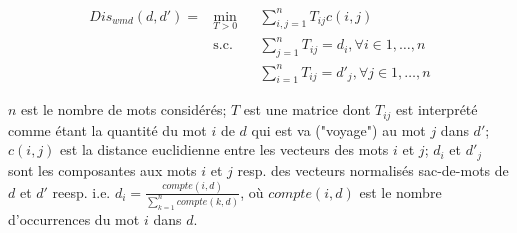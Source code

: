 \begin{itemize}
	\begin{equation*}
	\begin{aligned}
Dis_{wmd}(d, d') = 	& \min\limits_{T>0}
	& & \sum\limits_{i,j=1}^n T_{ij} c(i,j) \\
	& \text{s.c.}
	& & \sum\limits_{j=1}^n T_{ij} = d_i, \forall i \in {1, \dots, n} \\
	& 
	& & \sum\limits_{i=1}^n T_{ij} = d'_j, \forall j \in {1, \dots, n}	
	\end{aligned}
	\end{equation*} 
	
	$n$ est le nombre de mots considérés; $T$ est une matrice dont $T_{ij}$ est interprété comme étant la quantité du mot $i$ de $d$ qui est va ("voyage") au mot $j$ dans $d'$; $c(i,j)$ est la distance euclidienne entre les vecteurs des mots $i$ et $j$; $d_i$ et $d'_j$ sont les composantes aux mots $i$ et $j$ resp. des vecteurs normalisés sac-de-mots de $d$ et $d'$ reesp. i.e. $d_i = \frac{compte(i, d)}{\sum\limits_{k=1}^n compte(k, d)}$, où $compte(i, d)$ est le nombre d'occurrences du mot $i$ dans $d$.
	
\end{itemize}


 
